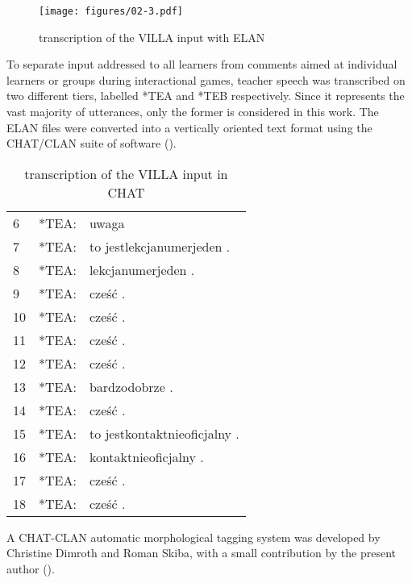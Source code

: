 \begin{figure}
    \texttt{[image: figures/02-3.pdf]}
    \caption{transcription of the VILLA input with ELAN}
    \label{fig:02:3}
\end{figure}

To separate input addressed to all learners from comments aimed at individual learners or groups during interactional games, teacher speech was transcribed on two different tiers, labelled *TEA and *TEB respectively. Since it represents the vast majority of utterances, only the former is considered in this work. The ELAN files were converted into a vertically oriented text format using the CHAT/CLAN \citep{MacWhinney2000} suite of software ().

\begin{table}
\ttfamily
    \begin{tabular}{lrl}
        6    &   *TEA: & uwaga\\
        7    &   *TEA: & to jestlekcjanumerjeden . \\
        8    &   *TEA: & lekcjanumerjeden .  \\
        9    &   *TEA: & cześć .  \\
        10   &   *TEA: & cześć .  \\
        11   &   *TEA: & cześć .  \\
        12   &   *TEA: & cześć .  \\
        13   &   *TEA: & bardzodobrze .  \\
        14   &   *TEA: & cześć .  \\
        15   &   *TEA: & to jestkontaktnieoficjalny .  \\
        16   &   *TEA: & kontaktnieoficjalny .  \\
        17   &   *TEA: & cześć .  \\
        18   &   *TEA: & cześć . \\
    \end{tabular}
    \caption{transcription of the VILLA input in CHAT}
    \label{tab:02:1}
\end{table}

A CHAT-CLAN automatic morphological tagging system was developed by Christine Dimroth and Roman Skiba, with a small contribution by the present author (). 

